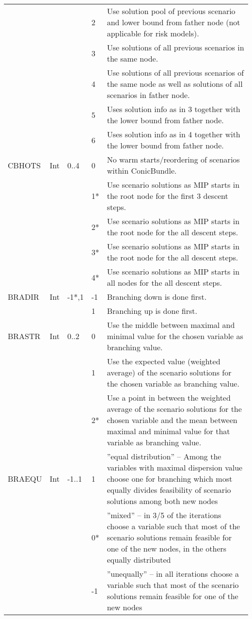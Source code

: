 \documentclass[11pt,draft]{article}
\newcommand{\+}{{\ti{+}}}
\newcommand{\1}{{\ti{1}}}
\begin{document}
\begin{center}
\begin{supertabular}{|llllp{6.2cm}|}
&&&2&Use solution pool of previous scenario and lower bound from father node (not applicable for risk models).\\
&&&3&Use solutions of all previous scenarios in the same node.\\ 
&&&4&Use solutions of all previous scenarios of the same node as well as solutions of all scenarios in father node.\\ 
&&&5&Uses solution info as in 3 together with the lower bound from father node.\\ 
&&&6&Uses solution info as in 4 together with the lower bound from father node.\\[0.2em]
CBHOTS&Int&0..4&0&No warm starts/reordering of scenarios within ConicBundle.\\
&&&1*&Use scenario solutions as MIP starts in the root node for the first 3 descent steps.\\
&&&2*&Use scenario solutions as MIP starts in the root node for the all descent steps.\\
&&&3*&Use scenario solutions as MIP starts in the root node for the all descent steps.\\
&&&4*&Use scenario solutions as MIP starts in all nodes for the all descent steps.\\[0.2em]
BRADIR&Int&-1*,1&-1&Branching down is done first.\\
&&&1&Branching up is done first. \\[0.2em]
BRASTR&Int&0..2&0&Use the middle between maximal and minimal value for the chosen variable as branching value.\\
&&&1&Use the expected value (weighted average) of the scenario solutions for the chosen variable as branching value.\\
&&&2*&Use a point in between the weighted average of the scenario solutions for the chosen variable and the mean between maximal and minimal value for that variable as branching value.\\[0.2em]
BRAEQU&Int&-1..1&1&''equal distribution'' -- Among the variables with maximal dispersion value choose one for branching which most equally divides feasibility of scenario solutions among both new nodes\\
&&&0*&''mixed'' -- in 3/5 of the iterations choose a variable such that most of the scenario solutions remain feasible for one of the new nodes, in the others equally distributed\\[0.2em]
&&&-1&''unequally'' -- in all iterations choose a variable such that most of the scenario solutions remain feasible for one of the new nodes \\[0.2em]

\end{supertabular}
\end{center}
\end{document}
